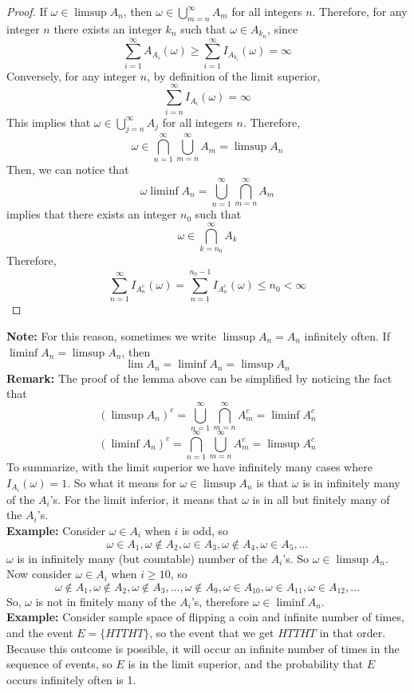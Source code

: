\documentclass[openany]{report}
\begin{document}
\begin{proof}
    If $\omega \in \limsup A_n$, then $\omega \in \bigcup\limits_{m=n}^\infty A_m$ for all integers $n$. Therefore, for any integer $n$ there exists an integer $k_n$ such that $\omega \in A_{k_n}$, since 
    \[\sum_{i=1}^\infty A_{A_i} (\omega) \geq \sum_{i=1}^\infty I_{A_{k_i}}(\omega) = \infty\]
    Conversely, for any integer $n$, by definition of the limit superior, 
    \[\sum_{i=n}^\infty I_{A_i}(\omega) = \infty\]
    This implies that $\omega \in \bigcup\limits_{j=n}^\infty A_j$ for all integers $n$. Therefore, 
    \[\omega \in \bigcap_{n=1}^\infty \bigcup_{m=n}^\infty A_m = \limsup A_n\]
    Then, we can notice that 
    \[\omega \liminf A_n = \bigcup_{n=1}^\infty \bigcap_{m=n}^\infty A_m \]
    implies that there exists an integer $n_0$ such that 
    \[\omega \in \bigcap_{k=n_0}^\infty A_k\]
    Therefore, 
    \[\sum_{n=1}^\infty I_{A_n^c} (\omega) = \sum_{n=1}^{n_0-1} I_{A_n^c} (\omega) \leq n_0 < \infty\]

\end{proof}
\textbf{Note:} For this reason, sometimes we write $\limsup A_n = A_n$ infinitely often. If $\liminf A_n = \limsup A_n$, then 
\[\lim A_n = \liminf A_n = \limsup A_n\]
\textbf{Remark:} The proof of the lemma above can be simplified by noticing the fact that 
\[(\limsup A_n)^c = \bigcup_{n=1}^\infty \bigcap_{m=n}^\infty A_m^c = \liminf A_n^c\]
\[(\liminf A_n)^c = \bigcap_{n=1}^\infty \bigcup_{m=n}^\infty A_m^c = \limsup A_n^c\]
To summarize, with the limit superior we have infinitely many cases where $I_{A_i}(\omega) = 1$. So what it means for $\omega \in \limsup A_n$ is that $\omega$ is in infinitely many of the $A_i$'s. For the limit inferior, it means that $\omega$ is in all but finitely many of the $A_i$'s.\\[2ex]
\noindent
\textbf{Example:}
Consider $\omega \in A_i$ when $i$ is odd, so 
\[\omega \in A_1, \omega \not\in A_2, \omega \in A_3, \omega \not\in A_4, \omega \in A_5, \ldots\]
$\omega$ is in infinitely many (but countable) number of the $A_i$'s. So $\omega \in \limsup A_n$. Now consider $\omega \in A_i$ when $i \geq 10$, so 
\[\omega \not\in A_1, \omega \not\in A_2, \omega \not\in A_3, \ldots, \omega \not\in A_9, \omega \in A_{10}, \omega \in A_{11}, \omega \in A_{12}, \ldots\]
So, $\omega$ is not in finitely many of the $A_i$'s, therefore $\omega \in \liminf A_n$.\\[2ex]
\noindent
\textbf{Example:} Consider sample space of flipping a coin and infinite number of times, and the event $E = \{HTTHT\}$, so the event that we get $HTTHT$ in that order. Because this outcome is possible, it will occur an infinite number of times in the sequence of events, so $E$ is in the limit superior, and the probability that $E$ occurs infinitely often is 1.
\end{document}
